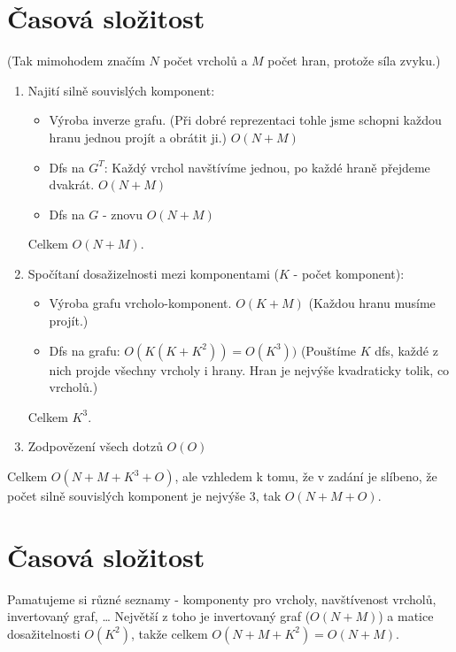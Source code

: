 \documentclass{article}
\begin{document}
\section{Časová složitost}
(Tak mimohodem značím \(N\) počet vrcholů a \(M\) počet hran, protože síla zvyku.)
\begin{enumerate}
    \item Najití silně souvislých komponent:
    \begin{itemize}
        \item Výroba inverze grafu. (Při dobré reprezentaci tohle jsme schopni každou hranu jednou projít a obrátit ji.) \(O(N+M)\)
        \item Dfs na \(G^T\): Každý vrchol navštívíme jednou, po každé hraně přejdeme dvakrát. \(O(N+M)\)
        \item Dfs na \(G\) - znovu \(O(N+M)\)
    \end{itemize}
    Celkem \(O(N+M)\).
    \item Spočítaní dosažizelnosti mezi komponentami (\(K\) - počet komponent):
    \begin{itemize}
        \item Výroba grafu vrcholo-komponent. \(O(K+M)\) (Každou hranu musíme projít.)
        \item Dfs na grafu: \(O(K (K+K^2)) = O(K^3))\) (Pouštíme \(K\) dfs, každé z nich projde všechny vrcholy i hrany.
        Hran je nejvýše kvadraticky tolik, co vrcholů.)
    \end{itemize}
    Celkem \(K^3\).
    \item Zodpovězení všech dotzů \(O(O)\)
\end{enumerate}
Celkem \(O(N+M+K^3+O)\), ale vzhledem k tomu, že v zadání je slíbeno, že počet silně souvislých komponent je nejvýše \(3\), tak
\(O(N+M+O)\).

\section{Časová složitost}
Pamatujeme si různé seznamy - komponenty pro vrcholy, navštívenost vrcholů, invertovaný graf, \dots
Největší z toho je invertovaný graf (\(O(N+M)\)) a matice dosažitelnosti \(O(K^2)\), takže celkem \(O(N+M+K^2) = O(N+M)\).
\end{document}
